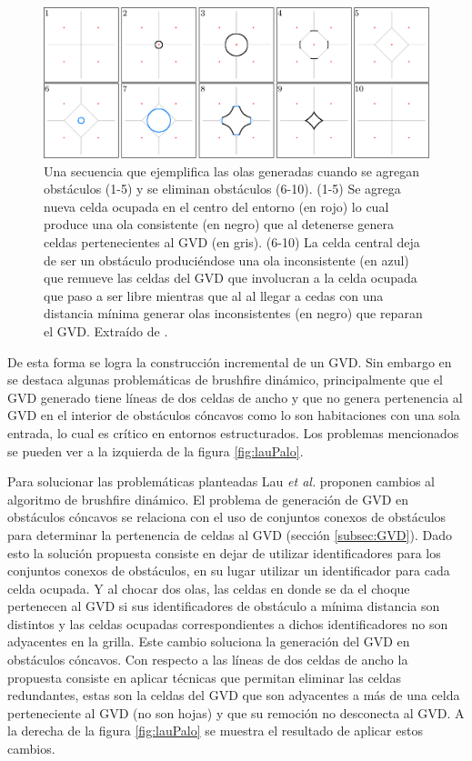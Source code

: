 \begin{figure}[H]
  \center
  \includegraphics[width=1\linewidth]{imagenes/wavesKalra.png}
  \caption[Olas de brushfire dinámico.]{Una secuencia que ejemplifica las olas generadas cuando se agregan obstáculos (1-5) y se eliminan obstáculos (6-10). (1-5) Se agrega nueva celda ocupada en el centro del entorno (en rojo) lo cual produce una ola consistente (en negro) que al detenerse genera celdas pertenecientes al GVD (en gris). (6-10) La celda central deja de ser un obstáculo produciéndose una ola inconsistente (en azul) que remueve las celdas del GVD que involucran a la celda ocupada que paso a ser libre mientras que al al llegar a cedas con una distancia mínima generar olas inconsistentes (en negro) que reparan el GVD. Extraído de \cite{kalra2009incremental}.}\label{fig:ejWavesIncKarlra}
\end{figure} 


De esta forma se logra la construcción incremental de un GVD. Sin embargo en \cite{Lau2013} se destaca algunas problemáticas de brushfire dinámico, principalmente que el GVD generado tiene líneas de dos celdas de ancho y que no genera pertenencia al GVD en el interior de obstáculos cóncavos como lo son habitaciones con una sola entrada, lo cual es crítico en entornos estructurados. Los problemas mencionados se pueden ver a la izquierda de la figura \ref{fig:lauPalo}.

Para solucionar las problemáticas planteadas Lau \textit{et al.}
proponen cambios al algoritmo de brushfire dinámico. El problema de
generación de GVD en obstáculos cóncavos se relaciona con el uso de
conjuntos conexos de obstáculos para determinar la pertenencia de celdas
al GVD (sección \ref{subsec:GVD}). Dado esto la solución propuesta
consiste en dejar de utilizar identificadores para los conjuntos conexos
de obstáculos, en su lugar utilizar un identificador para cada celda
ocupada. Y al chocar dos olas, las celdas en donde se da el choque
pertenecen al GVD si sus identificadores de obstáculo a mínima distancia
son distintos y las celdas ocupadas correspondientes a dichos
identificadores no son adyacentes en la grilla. Este cambio soluciona la
generación del GVD en obstáculos cóncavos. Con respecto a las líneas de
dos celdas de ancho la propuesta consiste en aplicar técnicas que
permitan eliminar las celdas redundantes, estas son la celdas del GVD
que son adyacentes a más de una celda perteneciente al GVD (no son
hojas) y que su remoción no desconecta al GVD. A la derecha de la figura
\ref{fig:lauPalo} se muestra el resultado de aplicar estos cambios.


